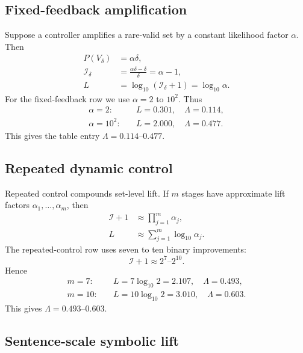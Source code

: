 \documentclass[
  aps,
  prresearch,
  reprint,
  amsmath,
  amssymb,
  superscriptaddress,
  nofootinbib,
  longbibliography
]{revtex4-2}
\newcommand{\calI}{\mathcal{I}}
\begin{document}
\subsection{Fixed-feedback amplification}

Suppose a controller amplifies a rare-valid set by a constant likelihood factor \(\alpha\). Then
\begin{align}
    P(V_\delta) &= \alpha\delta,\\
    \calI_\delta
        &=\frac{\alpha\delta-\delta}{\delta}
          =\alpha-1,\\
    L &=\log_{10}(\calI_\delta+1)
       =\log_{10}\alpha .
    \label{eq:appendix_constant_lift}
\end{align}
For the fixed-feedback row we use \(\alpha=2\) to \(10^2\). Thus
\begin{align}
    \alpha=2:\quad
    &L=0.301,\quad \Lambda=0.114,\\
    \alpha=10^2:\quad
    &L=2.000,\quad \Lambda=0.477.
\end{align}
This gives the table entry \(\Lambda=0.114\)--\(0.477\).

\subsection{Repeated dynamic control}

Repeated control compounds set-level lift. If \(m\) stages have approximate lift factors \(\alpha_1,\ldots,\alpha_m\), then
\begin{align}
    \calI+1 &\approx \prod_{j=1}^{m}\alpha_j,\\
    L &\approx \sum_{j=1}^{m}\log_{10}\alpha_j .
    \label{eq:appendix_sequential_lift}
\end{align}
The repeated-control row uses seven to ten binary improvements:
\begin{equation}
    \calI+1\approx 2^7\text{--}2^{10}.
\end{equation}
Hence
\begin{align}
    m=7:\quad
    &L=7\log_{10}2=2.107,\quad \Lambda=0.493,\\
    m=10:\quad
    &L=10\log_{10}2=3.010,\quad \Lambda=0.603.
\end{align}
This gives \(\Lambda=0.493\)--\(0.603\).

\subsection{Sentence-scale symbolic lift}
\end{document}

